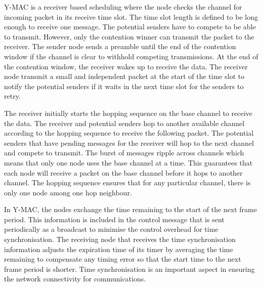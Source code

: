 Y-MAC is a receiver based scheduling where the node checks the channel for incoming packet in its receive time slot. The time slot length is defined to be long enough to receive one message. The potential senders have to compete to be able to transmit. However, only the contention winner can transmit the packet to the receiver. The sender node sends a preamble until the end of the contention window if the channel is clear to withhold competing transmissions. At the end of the contention window, the receiver wakes up to receive the data. The receiver node transmit a small and independent packet at the start of the time slot to notify the potential senders if it waits in the next time slot for the senders to retry.

The receiver initially starts the hopping sequence on the base channel to receive the data. The receiver and potential senders hop to another available channel according to the hopping sequence to receive the following packet. The potential senders that have pending messages for the receiver will hop to the next channel and compete to transmit. The burst of messages ripple across channels which means that only one node uses the base channel at a time. This guarantees that each node will receive a packet on the base channel before it hops to another channel. The hopping sequence ensures that for any particular channel, there is only one node among one hop neighbour.

In Y-MAC, the nodes exchange the time remaining to the start of the next frame period. This information is included in the control message that is sent periodically as a broadcast to minimise the control overhead for time synchronisation. The receiving node that receives the time synchronisation information adjusts the expiration time of its timer by averaging the time remaining to compensate any timing error so that the start time to the next frame period is shorter. Time synchronisation is an important aspect in ensuring the network connectivity for communications.


